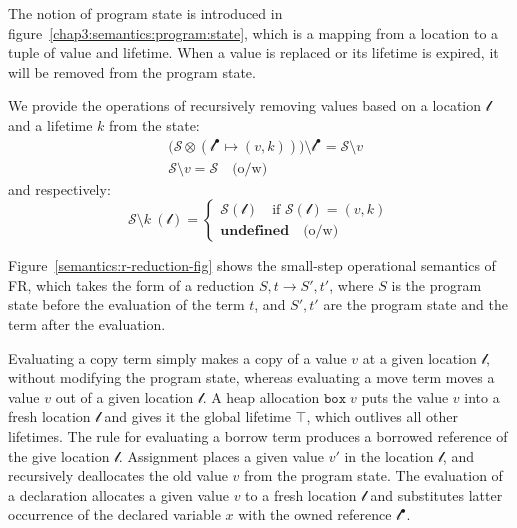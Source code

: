 The notion of program state is introduced in figure~\ref{chap3:semantics:program:state}, which is a mapping from a location to a tuple of value and lifetime. When a value is replaced or its lifetime is expired, it will be removed from the program state.

We provide the operations of recursively removing values based on a location $\mathscr{l}$ and a lifetime $k$ from the state: 
\begin{align*}
      &\bigl(\mathcal{S}\otimes(\mathscr{l}^\bullet \mapsto (v, k))\bigr)\setminus {\mathscr{l}^\bullet} = \mathcal{S}\setminus v \\
      &\mathcal{S}\setminus v = \mathcal{S} \quad\text{(o/w)}
\end{align*}
and respectively:
\[
   \mathcal{S}\setminus k \ (\mathscr{l}) =
    \begin{cases}
      \mathcal{S}(\mathscr{l}) \quad\text{if $\mathcal{S}(\mathscr{l})=(v,k)$} \\
      \textbf{undefined}\quad\text{(o/w)}
    \end{cases}
\] %

Figure~\ref{semantics:r-reduction-fig} shows the small-step operational semantics of FR, which takes the form of a reduction $S, t \longrightarrow S', t'$, where $S$ is the program state before the evaluation of the term $t$, and $S', t'$ are the program state and the term after the evaluation.

Evaluating a copy term simply makes a copy of a value $v$ at a given location $\mathscr{l}$, without modifying the program state, whereas evaluating a move term moves a value $v$ out of a given location $\mathscr{l}$.
A heap allocation $\texttt{box}\;v$ puts the value $v$ into a fresh location $\mathscr{l}$ and gives it the global lifetime $\top$, which outlives all other lifetimes. The rule for evaluating a borrow term produces a borrowed reference of the give location $\mathscr{l}$.
Assignment places a given value $v'$ in the location $\mathscr{l}$, and recursively deallocates the old value $v$ from the program state.
The evaluation of a declaration allocates a given value $v$ to a fresh location $\mathscr{l}$ and substitutes latter occurrence of the declared variable $x$ with the owned reference $\mathscr{l}^\bullet$.

